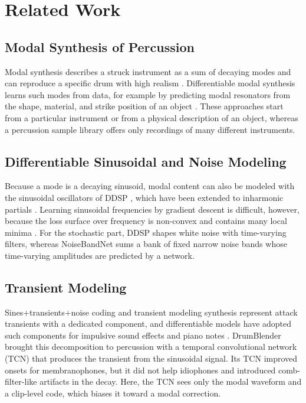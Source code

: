 \section{Related Work}
\label{sec:related}

\subsection{Modal Synthesis of Percussion}
Modal synthesis describes a struck instrument as a sum of decaying modes and can reproduce a specific drum with high realism \citep{kirby2021evolution}.
Differentiable modal synthesis learns such modes from data, for example by predicting modal resonators from the shape, material, and strike position of an object \citep{diaz2023rigid}.
These approaches start from a particular instrument or from a physical description of an object, whereas a percussion sample library offers only recordings of many different instruments.

\subsection{Differentiable Sinusoidal and Noise Modeling}
Because a mode is a decaying sinusoid, modal content can also be modeled with the sinusoidal oscillators of DDSP \citep{engel2020ddsp}, which have been extended to inharmonic partials \citep{renault2023ddsp}.
Learning sinusoidal frequencies by gradient descent is difficult, however, because the loss surface over frequency is non-convex and contains many local minima \citep{hayes2023sinusoidal}.
For the stochastic part, DDSP shapes white noise with time-varying filters, whereas NoiseBandNet \citep{barahonarios2024noisebandnet} sums a bank of fixed narrow noise bands whose time-varying amplitudes are predicted by a network.

\subsection{Transient Modeling}
Sines+transients+noise coding \citep{levine1998sines} and transient modeling synthesis \citep{verma2000extending} represent attack transients with a dedicated component, and differentiable models have adopted such components for impulsive sound effects \citep{liu2024ddspsfx} and piano notes \citep{simionato2025sines}.
DrumBlender \citep{shier2023differentiable} brought this decomposition to percussion with a temporal convolutional network (TCN) that produces the transient from the sinusoidal signal.
Its TCN improved onsets for membranophones, but it did not help idiophones and introduced comb-filter-like artifacts in the decay.
Here, the TCN sees only the modal waveform and a clip-level code, which biases it toward a modal correction.

